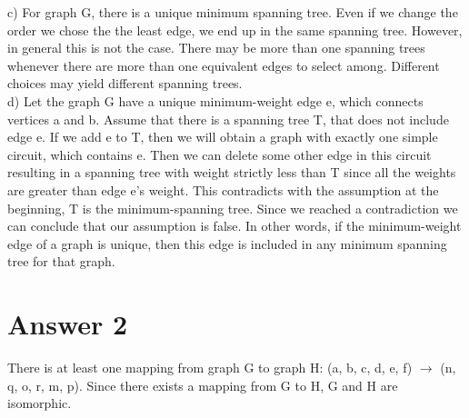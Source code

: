 \documentclass[12pt]{article}
\begin{document}
c) For graph G, there is a unique minimum spanning tree. Even if we change the order we chose the the least edge, we end up in the same spanning tree. However, in general this is not the case. There may be more than one spanning trees whenever there are more than one equivalent edges to select among. Different choices may yield different spanning trees.\\
d) Let the graph G have a unique minimum-weight edge e, which connects vertices a and b. Assume that there is a spanning tree T, that does not include edge e. If we add e to T, then we will obtain a graph with exactly one simple circuit, which contains e. Then we can delete some other edge in this circuit resulting in a spanning tree with weight strictly less than T since all the weights are greater than edge e's weight. This contradicts with the assumption at the beginning, T is the minimum-spanning tree. Since we reached a contradiction we can conclude that our assumption is false. In other words, if the minimum-weight edge of a graph is unique, then this edge is included in any minimum spanning tree for that graph.\\
\section*{Answer 2}
There is at least one mapping from graph G to graph H: (a, b, c, d, e, f) $\rightarrow$ (n, q, o, r, m, p). Since there exists a mapping from G to H, G and H are isomorphic.
\end{document}
